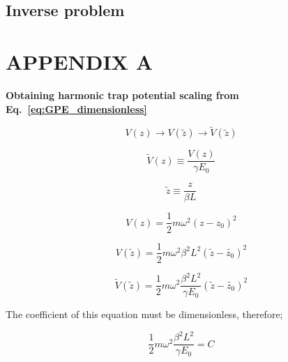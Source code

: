 \documentclass[a4paper,times,12pt]{article}
\begin{document}
\subsection{Inverse problem}


\clearpage

\clearpage




\appendix
\section{APPENDIX A}
\label{ap:scale}

\textbf{Obtaining harmonic trap potential scaling from Eq.~\eqref{eq:GPE_dimensionless}}

\begin{equation}
\label{eq:GPESCALE_harmonic_potential_transform}
    V(z) \rightarrow V(\widetilde{z}) \rightarrow \widetilde{V}(\widetilde{z})
\end{equation}

\begin{equation}
\label{eq:GPESCALE_dimensionless_harmonic_potential}
    \widetilde{V}(z) \equiv \frac{V(z)}{\gamma E_0}
\end{equation}

\begin{equation}
\label{eq:GPESCALE_dimensionless_length}
    \widetilde{z} \equiv \frac{z}{\beta L} 
\end{equation}

\begin{equation}
\label{eq:GPESCALE_harmonic_potential}
    V(z) = \frac{1}{2}m\omega^2 (z-z_0)^2
\end{equation}

\begin{equation}
\label{eq:GPESCALE_harmonic_length_transform}
    V(\widetilde{z}) = \frac{1}{2}m\omega^2 \beta^2 L^2 (\widetilde{z}-\widetilde{z_0})^2
\end{equation}

\begin{equation}
\label{eq:GPESCALE_harmonic_energy_transform}
    \widetilde{V}(\widetilde{z}) = \frac{1}{2} m\omega^2 \frac{\beta^2 L^2}{\gamma E_0} (\widetilde{z}-\widetilde{z_0})^2  
\end{equation}

The coefficient of this equation must be dimensionless, therefore;

\begin{equation}
\label{eq:GPESCALE_harmonic_coeff}
    \frac{1}{2} m\omega^2 \frac{\beta^2 L^2}{\gamma E_0} = C
\end{equation}
\end{document}
